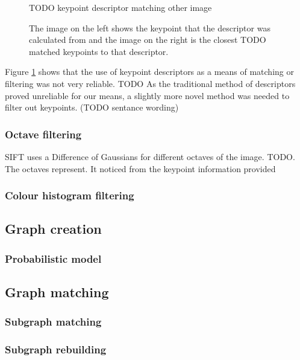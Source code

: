 \begin{figure}[H]
\centering
TODO keypoint descriptor matching other image
\caption{The image on the left shows the keypoint that the descriptor was calculated from and the image on the right is the closest TODO matched keypoints to that descriptor.}
\label{fig:kp-descriptor}
\end{figure}
\noindent
Figure \ref{fig:kp-descriptor} shows that the use of keypoint descriptors as a means of matching or filtering was not very reliable. TODO
\n
As the traditional method of descriptors proved unreliable for our means, a slightly more novel method was needed to filter out keypoints. (TODO sentance wording)

\subsubsection{Octave filtering}
SIFT uses a Difference of Gaussians for different octaves of the image.  TODO. The octaves represent. It noticed from the keypoint information provided 


\subsubsection{Colour histogram filtering}


\subsection{Graph creation}

\subsubsection{Probabilistic model}

\subsection{Graph matching}

\subsubsection{Subgraph matching}

\subsubsection{Subgraph rebuilding}
